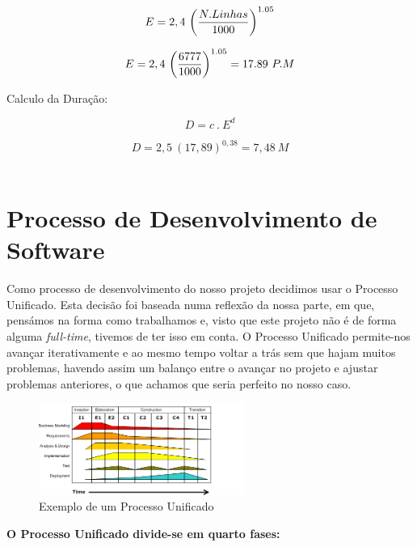 \documentclass[12pt, a4paper, twoside]{report} %
\begin{document}
\begin{equation} E = 2,4 \ \bigg({N.Linhas \over 1000}\bigg)^{1.05}
\end{equation}

\begin{equation}
{E = 2,4 \ \bigg({6777 \over 1000}\bigg) ^ {1.05}}
= 17.89 \ P.M
\end{equation}

Calculo da Duração:

\begin{equation}
D = c \ . \ E^d
\end{equation}

\begin{equation}
D = 2,5 \ (17,89)^{0,38}= 7,48\ M
\end{equation}
\\
\section{Processo de Desenvolvimento de Software}

Como processo de desenvolvimento do nosso projeto decidimos usar o Processo Unificado.
Esta decisão foi baseada numa reflexão da nossa parte, em que, pensámos na forma como trabalhamos e, visto que este projeto não é de forma alguma \textit{full-time}, tivemos de ter isso em conta. O Processo Unificado permite-nos avançar iterativamente e ao mesmo tempo voltar a trás sem que hajam muitos problemas, havendo assim um balanço entre o avançar no projeto e ajustar problemas anteriores, o que achamos que seria perfeito no nosso caso.
\\

\begin{figure}[h!]
  \centering
    \includegraphics[width=0.6\textwidth]{image1.png}
   \caption{Exemplo de um Processo Unificado}
\end{figure}

\clearpage

\textbf{O Processo Unificado divide-se em quarto fases:}
\\
\end{document}
